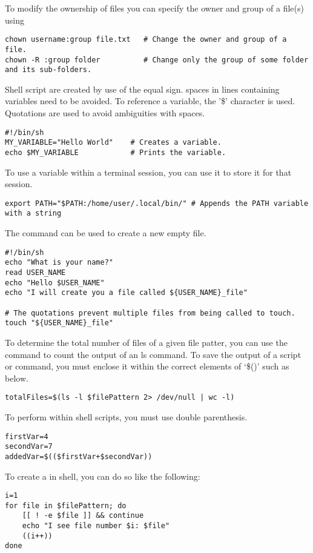 To modify the ownership of files you can specify the owner and group of a file(s) using 
\begin{lstlisting}
chown username:group file.txt   # Change the owner and group of a file.
chown -R :group folder          # Change only the group of some folder and its sub-folders.         
\end{lstlisting}

Shell script  are created by use of the equal sign. spaces in lines containing variables need to be avoided. To reference a variable, the '\$' character is used. Quotations are used to avoid ambiguities with spaces.
\begin{lstlisting}
#!/bin/sh
MY_VARIABLE="Hello World"    # Creates a variable.
echo $MY_VARIABLE            # Prints the variable.
\end{lstlisting}

To use a variable within a terminal session, you can use  it to store it for that session.
\begin{lstlisting}
export PATH="$PATH:/home/user/.local/bin/" # Appends the PATH variable with a string
\end{lstlisting}

The  command can be used to create a new empty file.
\begin{lstlisting}
#!/bin/sh
echo "What is your name?"
read USER_NAME
echo "Hello $USER_NAME"
echo "I will create you a file called ${USER_NAME}_file"

# The quotations prevent multiple files from being called to touch.
touch "${USER_NAME}_file"
\end{lstlisting}

To determine the total number of files of a given file patter, you can use the  command to count the output of an ls command. To save the output of a script or command, you must enclose it within the correct elements of `\$()' such as below.
\begin{lstlisting}
totalFiles=$(ls -l $filePattern 2> /dev/null | wc -l)
\end{lstlisting}

To perform  within shell scripts, you must use double parenthesis.
\begin{lstlisting}
firstVar=4
secondVar=7
addedVar=$(($firstVar+$secondVar))
\end{lstlisting}

To create a  in shell, you can do so like the following:
\begin{lstlisting}
i=1
for file in $filePattern; do
	[[ ! -e $file ]] && continue
	echo "I see file number $i: $file"
	((i++))
done
\end{lstlisting}

